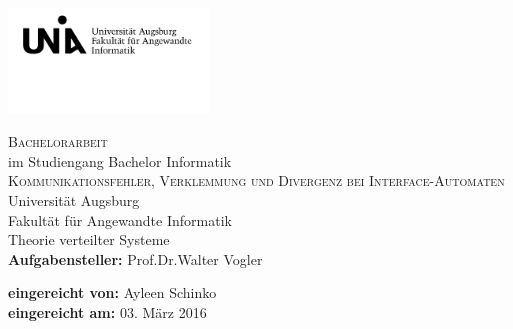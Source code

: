 \begin{titlepage}
\includegraphics[width=0.4\textwidth]{Uni_Aug_Logo_FAI_schwarz.png}
\vspace{-1cm}
\begin{center}
  \LARGE \textsc{Bachelorarbeit}\\
  \normalsize im Studiengang Bachelor Informatik\\
  \vfill
  \Huge \textsc{Kommunikationsfehler, Verklemmung und Divergenz bei
  Interface-Automaten}\\
  \vfill
  \Large Universität Augsburg\\
  Fakultät für Angewandte Informatik\\
  Theorie verteilter Systeme\\
  \vspace{2cm}
  \rmfamily \large \textbf{Aufgabensteller:} Prof.\;Dr.\;Walter Vogler
\end{center}
\vspace{1.5cm}
\large \textbf{eingereicht von:}
Ayleen Schinko\\
\textbf{eingereicht am:}
03. März 2016
\end{titlepage}
